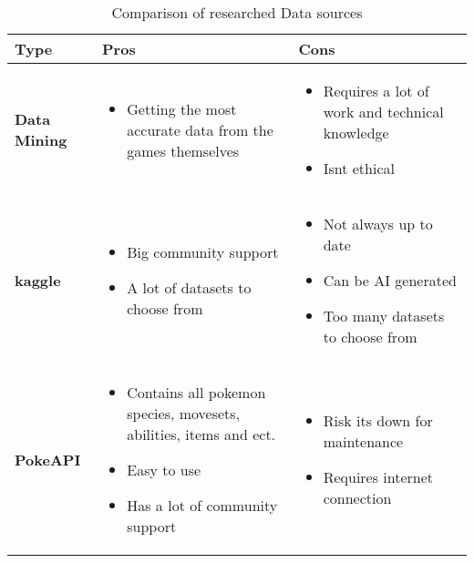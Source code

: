 \begin{table}[h]      
      \begin{tabular}{| m{3.5cm} | m{5cm} | m{5cm} |}
            \hline
            \textbf{Type} & \textbf{Pros} & \textbf{Cons} \\ 
            \hline
            \textbf{Data Mining} & 
            \begin{itemize}
                  \item Getting the most accurate data from the games themselves
            \end{itemize} & 
            \begin{itemize}
                  \item Requires a lot of work and technical knowledge
                  \item Isnt ethical
            \end{itemize} \\ 
            \hline
            \textbf{kaggle} & 
            \begin{itemize}
                  \item Big community support
                  \item A lot of datasets to choose from
            \end{itemize} & 
            \begin{itemize}
                  \item Not always up to date
                  \item Can be AI generated
                  \item Too many datasets to choose from
            \end{itemize} \\ 
            \hline
            \textbf{PokeAPI} & 
            \begin{itemize}
                  \item Contains all pokemon species, movesets, abilities, items and ect.
                  \item Easy to use
                  \item Has a lot of community support
            \end{itemize} & 
            \begin{itemize}
                  \item Risk its down for maintenance
                  \item Requires internet connection
            \end{itemize} \\ 
            \hline
      \end{tabular}
      \caption{Comparison of researched Data sources}
      \label{tab:datasource_comparison}
  \end{table}





